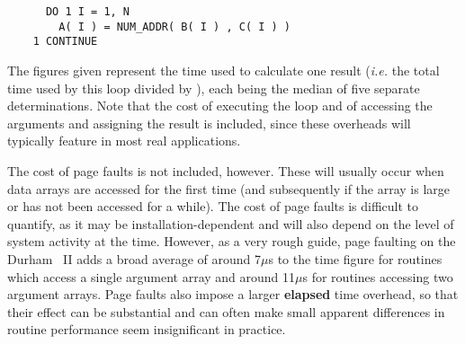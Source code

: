 \begin{verbatim}
      DO 1 I = 1, N
        A( I ) = NUM_ADDR( B( I ) , C( I ) )
    1 CONTINUE
\end{verbatim}

The figures given represent the  time used to calculate one result
({\em i.e.} the total  time used by this loop divided by
), each being the median of five separate determinations.
Note that the cost of executing the loop and of accessing the arguments and
assigning the result is included, since these overheads will typically
feature in most real applications.

The cost of page faults is not included, however.
These will usually occur when data arrays are accessed for the first time
(and subsequently if the array is large or has not been accessed for a while).
The cost of page faults is difficult to quantify, as it may be
installation-dependent and will also depend on the level of system activity
at the time.
However, as a very rough guide, page faulting on the Durham ~II
adds a broad average of around 7$\mu$s to the  time figure for
routines which access a single  argument array and around 11$\mu$s
for routines accessing two  argument arrays.
Page faults also impose a larger {\bf elapsed} time overhead, so that their
effect can be substantial and can often make small apparent differences in
routine performance seem insignificant in practice.

\newpage

